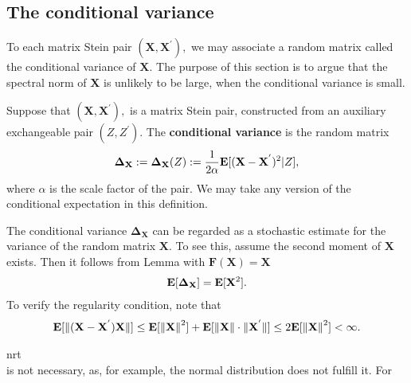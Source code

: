 \subsection{The conditional variance}
To each matrix Stein pair 
  $
  (
    \mathbf{X}
    ,
    \mathbf{X}^{'}
  ),
  $
  we may associate a random matrix called the conditional variance of $\mathbf{X}.$
  The purpose of this section is to argue that the spectral norm of $\mathbf{X}$
  is unlikely to be large, when the conditional variance is small.
\begin{definition}
  Suppose that
  $
  (
    \mathbf{X}
    ,
    \mathbf{X}^{'}
  ),
  $
  is a matrix Stein pair, constructed from an auxiliary exchangeable pair
  $
  (
  Z
    ,
  Z^{'}
  ).
  $
  The \textbf{conditional variance}
  is the random matrix
  \begin{gather}
    \mathbf{\Delta_X}
    :=
    \mathbf{\Delta_X}
    (Z)
    :=
    \frac{1}{2\alpha}
    \mathbf{E}
    [
    (
    \mathbf{X}
    -
    \mathbf{X}^{'}
    )^2
    \vert
    Z
    ]
    ,
  \end{gather}
  where $\alpha$ is the scale factor of the pair. We may take any version of the conditional expectation in this definition.
\end{definition}

The conditional variance
$
    \mathbf{\Delta_X}
$
can be regarded as a stochastic estimate for the variance 
of the random matrix $\mathbf{X}.$
To see this, assume
the second moment of $\mathbf{X}$ exists. Then it follows from Lemma 
with $\mathbf{F}(\mathbf{X})=\mathbf{X}$
\begin{gather}
  \mathbf{E}
  [
    \mathbf{\Delta_X}
  ]
  =
  \mathbf{E}
  [
  \mathbf{X}^2
  ]
  .
\end{gather}
To verify the regularity condition, note that
\begin{gather}
  \mathbf{E}
  [
  \lVert
    (
    \mathbf{X}
    -
    \mathbf{X}^{'}
    )
    \mathbf{X}
    \rVert
  ]
  \le
  \mathbf{E}[
  \left\lVert
    \mathbf{X}
  \right\rVert
  ^2
  ]
  +
  \mathbf{E}
  [
  \left\lVert
    \mathbf{X}
  \right\rVert
  \cdot
  \lVert
    \mathbf{X}^{'}
    \rVert
  ]
  \le
  2
  \mathbf{E}
  [
  \left\lVert
    \mathbf{X}
  \right\rVert
  ^2
  ]
  <
  \infty
  .
\end{gather}
\begin{example}
  \emph{\cite[Example~2.4]{Mackey2014}}
\end{example}
nrt\\
is not necessary, as, for example, the normal distribution does not fulfill it. For
